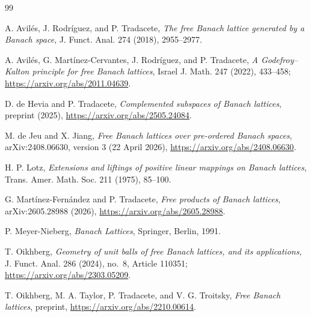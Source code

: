 \documentclass[11pt]{article}
\begin{document}
\begin{thebibliography}{99}

A. Avil\'es, J. Rodr\'iguez, and P. Tradacete,
\emph{The free Banach lattice generated by a Banach space},
J. Funct. Anal. 274 (2018), 2955--2977.

A. Avil\'es, G. Mart\'inez-Cervantes, J. Rodr\'iguez, and P. Tradacete,
\emph{A Godefroy--Kalton principle for free Banach lattices},
Israel J. Math. 247 (2022), 433--458;
\url{https://arxiv.org/abs/2011.04639}.

D. de Hevia and P. Tradacete,
\emph{Complemented subspaces of Banach lattices},
preprint (2025), \url{https://arxiv.org/abs/2505.24084}.

M. de Jeu and X. Jiang,
\emph{Free Banach lattices over pre-ordered Banach spaces},
arXiv:2408.06630, version 3 (22 April 2026),
\url{https://arxiv.org/abs/2408.06630}.

H. P. Lotz,
\emph{Extensions and liftings of positive linear mappings on Banach lattices},
Trans. Amer. Math. Soc. 211 (1975), 85--100.

G. Mart\'inez-Fern\'andez and P. Tradacete,
\emph{Free products of Banach lattices},
arXiv:2605.28988 (2026),
\url{https://arxiv.org/abs/2605.28988}.

P. Meyer-Nieberg,
\emph{Banach Lattices}, Springer, Berlin, 1991.

T. Oikhberg,
\emph{Geometry of unit balls of free Banach lattices, and its applications},
J. Funct. Anal. 286 (2024), no.~8, Article 110351;
\url{https://arxiv.org/abs/2303.05209}.

T. Oikhberg, M. A. Taylor, P. Tradacete, and V. G. Troitsky,
\emph{Free Banach lattices},
preprint, \url{https://arxiv.org/abs/2210.00614}.

\end{thebibliography}
\end{document}
